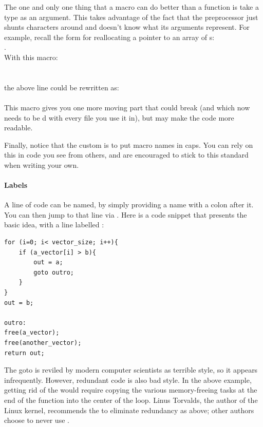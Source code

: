 \documentclass[12pt]{article}
\makeatletter
\def\ttind#1{\index{#1@\cinline{#1}}\cinline{#1}}
\makeatother
\begin{document}
The one and only one thing that a macro can do better than a function is
take a type as an argument. This takes advantage of the fact that the preprocessor 
just shunts characters around and doesn't know what its arguments represent.
For example, recall the form for reallocating a pointer to an array of s:\\
.\\
With this macro:\\
\\
\\the above line could be rewritten as:\\
\\
This macro gives you one more moving part that could break (and which
now needs to be d with every file you use it in), but
may make the code more readable.


Finally, notice that the custom is to put macro names in caps.  You can
rely on this in code you see from others, and are encouraged to stick
to this standard when writing your own.

\paragraph{Labels} A line of code can be named, by simply providing a
name with a colon after it. You can then jump to that line via \ttind{goto}. Here is a code snippet that presents the basic idea, with a line labelled :
\begin{lstlisting}
for (i=0; i< vector_size; i++){
    if (a_vector[i] > b){
        out = a;
        goto outro;
    }
}
out = b;

outro:
free(a_vector);
free(another_vector);
return out;
\end{lstlisting}
The goto is reviled by modern computer scientists as terrible style, so
it appears infrequently. However, redundant code is also bad style. 
In the above example, getting rid of the  would require
copying the various memory-freeing
tasks at the end of the function into the center of the  loop.
Linus Torvalds, the author of the Linux kernel, recommends the  to eliminate redundancy as above; other authors choose to never use
.
\end{document}
